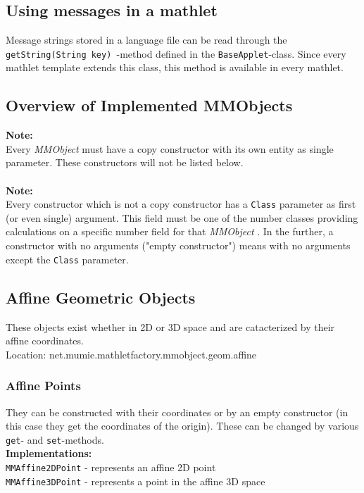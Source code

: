 \documentclass[a4paper,12pt]{book}
\newcommand{\mmo}{\emph{MMObject }}
\begin{document}
  \section{Using messages in a mathlet}
  Message strings stored in a language file can be read through the {\tt getString(String key) }-method
  defined in the {\tt BaseApplet}-class. Since every mathlet template extends this class,
  this method is available in every mathlet.
  

\begin{appendix}

\chapter{Overview of Implemented MMObjects}

  {\bf Note:}\\
  Every \mmo must have a copy constructor with its own entity as single parameter.
  These constructors will not be listed below.\\
  \\
  {\bf Note:}\\
  Every constructor which is not a copy constructor has a \verb|Class| parameter as first
  (or even single) argument. This field must be one of the number classes providing calculations
  on a specific number field for that \mmo. In the further, a constructor with no arguments
  ("empty constructor") means with no arguments except the \verb|Class| parameter.
  
  \section{Affine Geometric Objects}
    These objects exist whether in 2D or 3D space and are catacterized by their affine coordinates.\\
    Location: net.mumie.mathletfactory.mmobject.geom.affine
    
    \subsection{Affine Points}
      They can be constructed with their coordinates or by an empty constructor (in this case they get
      the coordinates of the origin). These can be changed by various \verb|get|- and \verb|set|-methods.\\
      {\bf Implementations:}\\
        \verb|MMAffine2DPoint| - represents an affine 2D point\\
        \verb|MMAffine3DPoint| - represents a point in the affine 3D space
        

\end{appendix}
\end{document}

